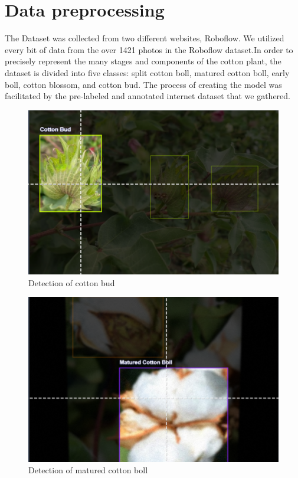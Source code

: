 \documentclass[12pt,a4paper]{report}
\begin{document}
\section {Data preprocessing}
\par The Dataset was collected from two different websites, Roboflow. We utilized every bit of data from the over 1421 photos in the Roboflow dataset.In order to precisely represent the many stages and components of the cotton plant, the dataset is divided into five classes: split cotton boll, matured cotton boll, early boll, cotton blossom, and cotton bud. The process of creating the model was facilitated by the pre-labeled and annotated internet dataset that we gathered. 
\begin{figure}[!htb]
\begin{center}
\includegraphics[scale=0.4]{images/detection/bud.png}
\caption{Detection of cotton bud}
\end{center}
\end{figure}
\begin{figure}[!htb]
\begin{center}
\includegraphics[scale=0.4]{images/detection/matured.png}
\caption{Detection of matured cotton boll}
\end{center}
\end{figure}
\end{document}
